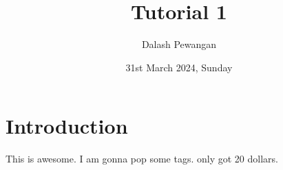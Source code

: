 \documentclass{article}
\title{Tutorial 1}
\author{Dalash Pewangan}
\date{31st March 2024, Sunday}
\begin{document}
\maketitle

\section{Introduction}
This is awesome. I am gonna pop some tags. only got 20 dollars. 
\end{document}
